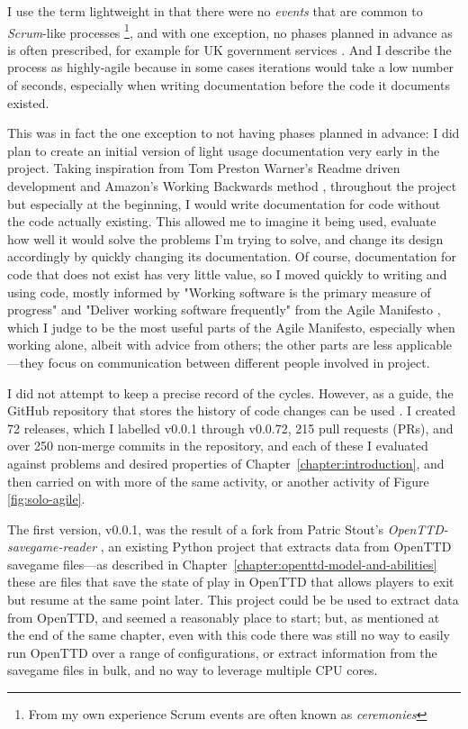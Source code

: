 \documentclass[logo,msc,dsti]{style/infthesis}    %
\begin{document}
{I use the term lightweight in that there were no \emph{events} that are common to \emph{Scrum}-like processes \cite{SCRUM}\footnote{From my own experience Scrum events are often known as \emph{ceremonies}}, and with one exception, no phases planned in advance as is often prescribed, for example for UK government services \cite{GOVUKAgile}. And I describe the process as highly-agile because in some cases iterations would take a low number of seconds, especially when writing documentation before the code it documents existed.

This was in fact the one exception to not having phases planned in advance: I did plan to create an initial version of light usage documentation very early in the project. Taking inspiration from Tom Preston Warner's Readme driven development \cite{ReadmeDrivenDevelopment} and Amazon's Working Backwards method \cite{bryar2021working}, throughout the project but especially at the beginning, I would write documentation for code without the code actually existing. This allowed me to imagine it being used, evaluate how well it would solve the problems I'm trying to solve, and change its design accordingly by quickly changing its documentation. Of course, documentation for code that does not exist has very little value, so I moved quickly to writing and using code, mostly informed by "Working software is the primary measure of progress" and "Deliver working software frequently" from the Agile Manifesto \cite{beck2001manifesto}, which I judge to be the most useful parts of the Agile Manifesto, especially when working alone, albeit with advice from others; the other parts are less applicable---they focus on communication between different people involved in project.

I did not attempt to keep a precise record of the cycles. However, as a guide, the GitHub repository that stores the history of code changes can be used \cite{OpenTTDLab}. I created 72 releases, which I labelled v0.0.1 through v0.0.72, 215 pull requests (PRs), and over 250 non-merge commits in the repository, and each of these I evaluated against problems and desired properties of Chapter~\ref{chapter:introduction}, and then carried on with more of the same activity, or another activity of Figure \ref{fig:solo-agile}.

The first version, v0.0.1, was the result of a fork from Patric Stout's \emph{OpenTTD-savegame-reader} \cite{Stout2024}, an existing Python project that extracts data from OpenTTD savegame files---as described in Chapter~\ref{chapter:openttd-model-and-abilities} these are files that save the state of play in OpenTTD that allows players to exit but resume at the same point later. This project could be be used to extract data from OpenTTD, and seemed a reasonably place to start; but, as mentioned at the end of the same chapter, even with this code there was still no way to easily run OpenTTD over a range of configurations, or extract information from the savegame files in bulk, and no way to leverage multiple CPU cores.

}
\end{document}
